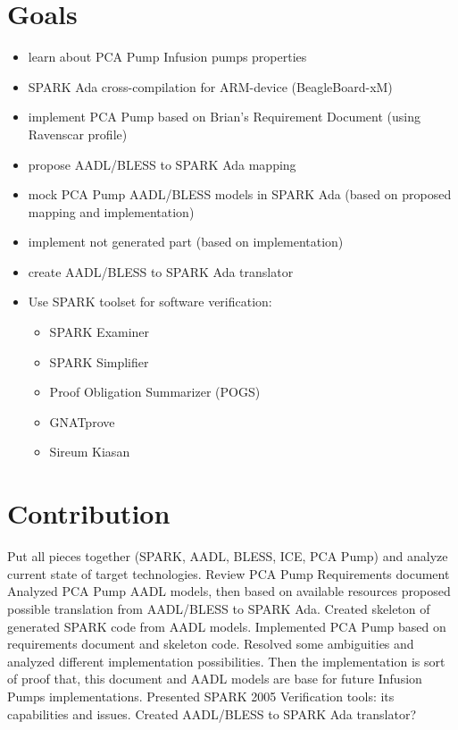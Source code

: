 \section{Goals}
\label{introduction:goals}
\begin{itemize}
	\item learn about PCA Pump Infusion pumps properties
	\item SPARK Ada cross-compilation for ARM-device (BeagleBoard-xM)
	\item implement PCA Pump based on Brian's Requirement Document (using Ravenscar profile)
	\item propose AADL/BLESS to SPARK Ada mapping
	\item mock PCA Pump AADL/BLESS models in SPARK Ada (based on proposed mapping and implementation)
	\item implement not generated part (based on implementation)
	\item create AADL/BLESS to SPARK Ada translator
	\item Use SPARK toolset for software verification:
		\begin{itemize}
			\item SPARK Examiner
			\item SPARK Simplifier %
			\item Proof Obligation Summarizer (POGS)
			\item GNATprove
			\item Sireum Kiasan
		\end{itemize}
\end{itemize}




\section{Contribution}
\label{introduction:contribution}
Put all pieces together (SPARK, AADL, BLESS, ICE, PCA Pump) and analyze current state of target technologies.
Review PCA Pump Requirements document
Analyzed PCA Pump AADL models, then based on available resources proposed possible translation from AADL/BLESS to SPARK Ada.
Created skeleton of generated SPARK code from AADL models.
Implemented PCA Pump based on requirements document and skeleton code. Resolved some ambiguities and analyzed different implementation possibilities. Then the implementation is sort of proof that, this document and AADL models are base for future Infusion Pumps implementations.
Presented SPARK 2005 Verification tools: its capabilities and issues.
Created AADL/BLESS to SPARK Ada translator?



